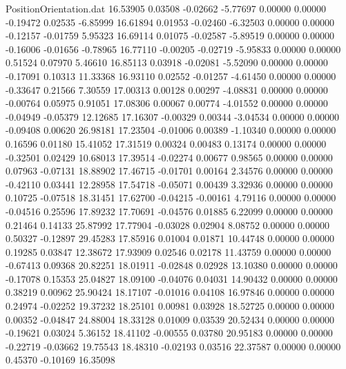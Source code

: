 \begin{filecontents}{PositionOrientation.dat}
  16.53905    0.03508   -0.02662    -5.77697    0.00000    0.00000   -0.19472    0.02535   -6.85999
  16.61894    0.01953   -0.02460    -6.32503    0.00000    0.00000   -0.12157   -0.01759    5.95323
  16.69114    0.01075   -0.02587    -5.89519    0.00000    0.00000   -0.16006   -0.01656   -0.78965
  16.77110   -0.00205   -0.02719    -5.95833    0.00000    0.00000    0.51524    0.07970    5.46610
  16.85113    0.03918   -0.02081    -5.52090    0.00000    0.00000   -0.17091    0.10313   11.33368
  16.93110    0.02552   -0.01257    -4.61450    0.00000    0.00000   -0.33647    0.21566    7.30559
  17.00313    0.00128    0.00297    -4.08831    0.00000    0.00000   -0.00764    0.05975    0.91051
  17.08306    0.00067    0.00774    -4.01552    0.00000    0.00000   -0.04949   -0.05379   12.12685
  17.16307   -0.00329    0.00344    -3.04534    0.00000    0.00000   -0.09408    0.00620   26.98181
  17.23504   -0.01006    0.00389    -1.10340    0.00000    0.00000    0.16596    0.01180   15.41052
  17.31519    0.00324    0.00483     0.13174    0.00000    0.00000   -0.32501    0.02429   10.68013
  17.39514   -0.02274    0.00677     0.98565    0.00000    0.00000    0.07963   -0.07131   18.88902
  17.46715   -0.01701    0.00164     2.34576    0.00000    0.00000   -0.42110    0.03441   12.28958
  17.54718   -0.05071    0.00439     3.32936    0.00000    0.00000    0.10725   -0.07518   18.31451
  17.62700   -0.04215   -0.00161     4.79116    0.00000    0.00000   -0.04516    0.25596   17.89232
  17.70691   -0.04576    0.01885     6.22099    0.00000    0.00000    0.21464    0.14133   25.87992
  17.77904   -0.03028    0.02904     8.08752    0.00000    0.00000    0.50327   -0.12897   29.45283
  17.85916    0.01004    0.01871    10.44748    0.00000    0.00000    0.19285    0.03847   12.38672
  17.93909    0.02546    0.02178    11.43759    0.00000    0.00000   -0.67413    0.09368   20.82251
  18.01911   -0.02848    0.02928    13.10380    0.00000    0.00000   -0.17078    0.15353   25.04827
  18.09100   -0.04076    0.04031    14.90432    0.00000    0.00000    0.38219    0.00962   25.90424
  18.17107   -0.01016    0.04108    16.97846    0.00000    0.00000    0.24974   -0.02252   19.37232
  18.25101    0.00981    0.03928    18.52725    0.00000    0.00000    0.00352   -0.04847   24.88004
  18.33128    0.01009    0.03539    20.52434    0.00000    0.00000   -0.19621    0.03024    5.36152
  18.41102   -0.00555    0.03780    20.95183    0.00000    0.00000   -0.22719   -0.03662   19.75543
  18.48310   -0.02193    0.03516    22.37587    0.00000    0.00000    0.45370   -0.10169   16.35098

\end{filecontents}
